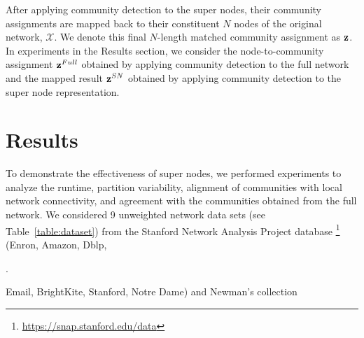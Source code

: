 After applying community detection to the super nodes, their community assignments are mapped back to their constituent $N$ nodes of the original network, ${\mathcal X}$. We denote this final $N$-length matched community assignment as ${\bf z}$. In experiments in the Results section, we consider the node-to-community assignment ${\bf z}^{Full}$ obtained by applying community detection to the full network and the mapped result ${\bf z}^{SN}$ obtained by applying community detection to the super node representation.

\section{Results}
To demonstrate the effectiveness of super nodes, we performed experiments to analyze the runtime, partition variability, alignment of communities with local network connectivity, and agreement with the communities obtained from the full network. We considered 9 unweighted network data sets (see Table~\ref{table:dataset})  from the Stanford Network Analysis Project database
\footnote{\url{https://snap.stanford.edu/data}} 
(Enron, Amazon, Dblp, 
\begin{table}.   %
\begin{center}
\end{center}
\caption{{\bf Network data characteristics.} \label{table:dataset}}
\end{table}
Email, BrightKite, Stanford, Notre Dame) and Newman's collection
